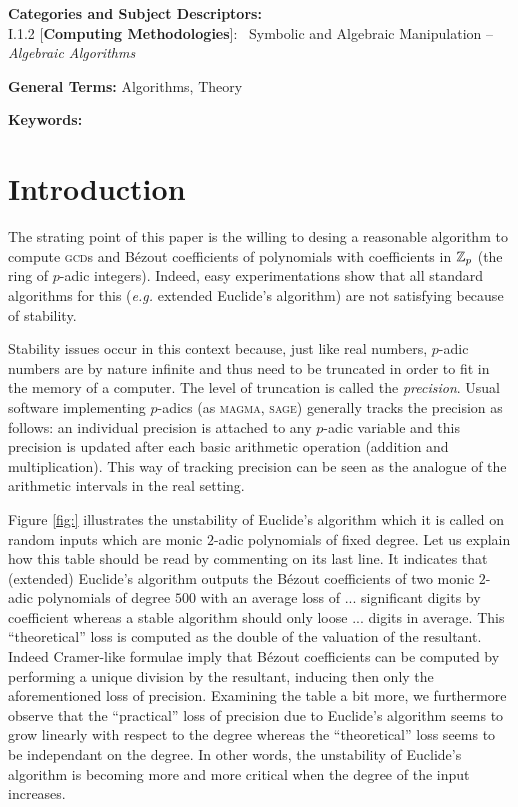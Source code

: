 \documentclass{sig-alternate}
\begin{document}
\vspace{1mm}
 \noindent
 {\bf Categories and Subject Descriptors:} \\
\noindent I.1.2 [{\bf Computing Methodologies}]:{~} Symbolic and Algebraic
  Manipulation -- \emph{Algebraic Algorithms}

 \vspace{1mm}
 \noindent
 {\bf General Terms:} Algorithms, Theory

 \vspace{1mm}
 \noindent
 {\bf Keywords:} 
\medskip

\section{Introduction}

The strating point of this paper is the willing to desing a reasonable 
algorithm to compute \textsc{gcd}s and B\'ezout coefficients of 
polynomials with coefficients in $\mathbb Z_p$ (the ring of $p$-adic integers). 
Indeed, easy experimentations show that all standard algorithms for this 
(\emph{e.g.} extended Euclide's algorithm) are not satisfying because of 
stability. 

Stability issues occur in this context because, just like real numbers, 
$p$-adic numbers are by nature infinite and thus need to be truncated in 
order to fit in the memory of a computer. The level of truncation is 
called the \emph{precision}. Usual software implementing $p$-adics (as 
\textsc{magma}, \textsc{sage}) generally tracks the precision as follows:
an individual precision is attached to any $p$-adic variable and this
precision is updated after each basic arithmetic operation (addition
and multiplication). This way of tracking precision can be seen as the
analogue of the arithmetic intervals in the real setting.

Figure \ref{fig:} illustrates the unstability of Euclide's algorithm 
which it is called on random inputs which are monic $2$-adic polynomials 
of fixed degree. Let us explain how this table should be read by 
commenting on its last line. It indicates that (extended) Euclide's 
algorithm outputs the B\'ezout coefficients of two monic $2$-adic 
polynomials of degree $500$ with an average loss of $...$ significant 
digits by coefficient whereas a stable algorithm should only loose $...$ 
digits in average. This ``theoretical'' loss is computed as the double 
of the valuation of the resultant. Indeed Cramer-like formulae imply 
that B\'ezout coefficients can be computed by performing a unique 
division by the resultant, inducing then only the aforementioned loss 
of precision. Examining the table a bit more, we furthermore observe 
that the ``practical'' loss of precision due to Euclide's algorithm 
seems to grow linearly with respect to the degree whereas the 
``theoretical'' loss seems to be independant on the degree. In other
words, the unstability of Euclide's algorithm is becoming more and
more critical when the degree of the input increases.
\end{document}
